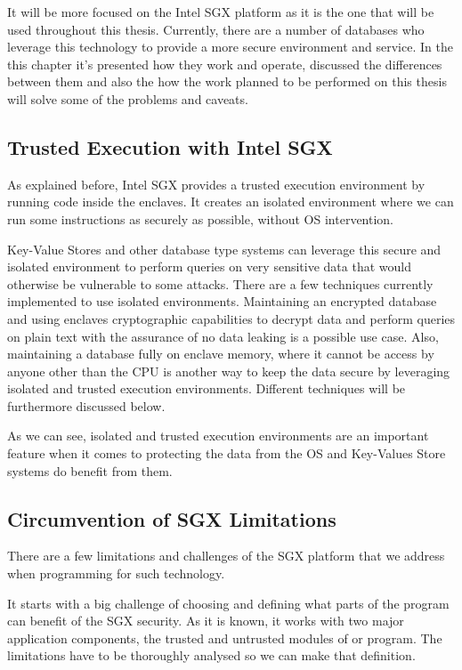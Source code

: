 It will be more focused on the Intel SGX platform as it is the one that will be used throughout this thesis. Currently, there are a number of databases who leverage this technology to provide a more secure environment and service. In the this chapter it's presented how they work and operate, discussed the differences between them and also the how the work planned to be performed on this thesis will solve some of the problems and caveats. 

\subsection{Trusted Execution with Intel SGX}
\label{ssec:trusted_execution_with_sgx}

As explained before, Intel SGX provides a trusted execution environment by running code inside the enclaves. It creates an isolated environment where we can run some instructions as securely as possible, without \gls{OS} intervention.

Key-Value Stores and other database type systems can leverage this secure and isolated environment to perform queries on very sensitive data that would otherwise be vulnerable to some attacks. There are a few techniques currently implemented to use isolated environments. Maintaining an encrypted database and using enclaves cryptographic capabilities to decrypt data and perform queries on plain text with the assurance of no data leaking is a possible use case. Also, maintaining a database fully on enclave memory, where it cannot be access by anyone other than the CPU is another way to keep the data secure by leveraging isolated and trusted execution environments. Different techniques will be furthermore discussed below. 

As we can see, isolated and trusted execution environments are an important feature when it comes to protecting the data from the \gls{OS} and Key-Values Store systems do benefit from them.

\subsection{Circumvention of SGX Limitations}
\label{ssec:circumvention_of_sgx_limitations}

There are a few limitations and challenges of the SGX platform that we address when programming for such technology.

It starts with a big challenge of choosing and defining what parts of the program can benefit of the \gls{SGX} security. As it is known, it works with two major application components, the trusted and untrusted modules of or program. The limitations have to be thoroughly analysed so we can make that definition.  

